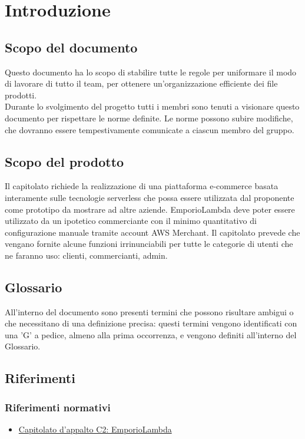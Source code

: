 \section{Introduzione}
    \subsection{Scopo del documento}
    Questo documento ha lo scopo di stabilire tutte le regole per uniformare il modo di lavorare di tutto il team, per ottenere un'organizzazione efficiente dei file prodotti. \\Durante lo svolgimento del progetto tutti i membri sono tenuti a visionare questo documento per rispettare le norme definite.
    Le norme possono subire modifiche, che dovranno essere tempestivamente comunicate a ciascun membro del gruppo.

    \subsection{Scopo del prodotto}
    Il capitolato richiede la realizzazione di una piattaforma e-commerce basata interamente sulle tecnologie serverless che possa essere utilizzata dal proponente come prototipo da mostrare ad altre aziende. EmporioLambda deve poter essere utilizzato da un ipotetico commerciante con il minimo quantitativo di configurazione manuale tramite account AWS Merchant. Il capitolato prevede che vengano fornite alcune funzioni irrinunciabili per tutte le categorie di utenti che ne faranno uso: clienti, commercianti, admin.
    \subsection{Glossario}
    All'interno del documento sono presenti termini che possono risultare ambigui o che necessitano di una definizione precisa: questi termini vengono identificati con una 'G' a pedice, almeno alla prima occorrenza, e vengono definiti all'interno del Glossario.
    \subsection{Riferimenti}
        \subsubsection{Riferimenti normativi}
        \begin{itemize}
            \item \href{https://www.math.unipd.it/~tullio/IS-1/2020/Progetto/C2.pdf}{Capitolato d'appalto C2: EmporioLambda}
        \end{itemize}

